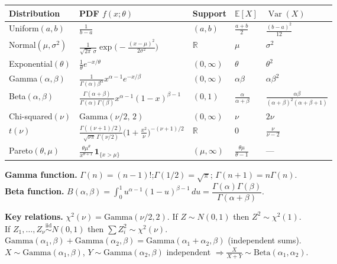 \documentclass[11pt]{article}
\newcommand{\bbE}{\mathbb{E}}
\newcommand{\bbR}{\mathbb{R}}
\newcommand{\Var}{\operatorname{Var}}
\newcommand{\ind}[1]{\bm{1}_{\{#1\}}}
\begin{document}
\begin{tabular}{lllll}
  \toprule
  \textbf{Distribution} & \textbf{PDF} $f(x;\theta)$ &
  \textbf{Support} & $\bbE[X]$ & $\Var(X)$ \\
  \midrule
  Uniform$(a,b)$ & $\frac{1}{b-a}$ & $(a,b)$ & $\frac{a+b}{2}$ &
  $\frac{(b-a)^2}{12}$ \\[4pt]
  Normal$(\mu,\sigma^2)$ &
  $\frac{1}{\sqrt{2\pi}\,\sigma}\exp\!\bigl(-\frac{(x-\mu)^2}{2\sigma^2}\bigr)$
  & $\bbR$ & $\mu$ & $\sigma^2$ \\[4pt]
  Exponential$(\theta)$ & $\frac{1}{\theta}e^{-x/\theta}$ &
  $(0,\infty)$ & $\theta$ & $\theta^2$ \\[4pt]
  Gamma$(\alpha,\beta)$ &
  $\frac{1}{\Gamma(\alpha)\beta^\alpha}x^{\alpha-1}e^{-x/\beta}$ &
  $(0,\infty)$ & $\alpha\beta$ & $\alpha\beta^2$ \\[4pt]
  Beta$(\alpha,\beta)$ &
  $\frac{\Gamma(\alpha+\beta)}{\Gamma(\alpha)\Gamma(\beta)}x^{\alpha-1}(1-x)^{\beta-1}$
  & $(0,1)$ & $\frac{\alpha}{\alpha+\beta}$ &
  $\frac{\alpha\beta}{(\alpha+\beta)^2(\alpha+\beta+1)}$ \\[4pt]
  Chi-squared$(\nu)$ & $\mathrm{Gamma}(\nu/2,\,2)$ & $(0,\infty)$ &
  $\nu$ & $2\nu$ \\[4pt]
  $t(\nu)$ &
  $\frac{\Gamma((\nu+1)/2)}{\sqrt{\nu\pi}\,\Gamma(\nu/2)}\bigl(1+\frac{x^2}{\nu}\bigr)^{-(\nu+1)/2}$
  & $\bbR$ & $0$ & $\frac{\nu}{\nu-2}$ \\[4pt]
  Pareto$(\theta,\mu)$ &
  $\frac{\theta\mu^\theta}{x^{\theta+1}}\,\ind{x>\mu}$ &
  $(\mu,\infty)$ & $\frac{\theta\mu}{\theta-1}$ & --- \\[4pt]
  \bottomrule
\end{tabular}

\medskip
\noindent\textbf{Gamma function.}
$\Gamma(n)=(n-1)!$;\quad $\Gamma(1/2)=\sqrt{\pi}$;\quad
$\Gamma(n+1)=n\Gamma(n)$.\\
\textbf{Beta function.}
$B(\alpha,\beta)=\int_0^1 u^{\alpha-1}(1-u)^{\beta-1}\,du =
\dfrac{\Gamma(\alpha)\Gamma(\beta)}{\Gamma(\alpha+\beta)}$.

\medskip
\noindent\textbf{Key relations.}
$\chi^2(\nu)=\mathrm{Gamma}(\nu/2,2)$.\quad
If $Z\sim N(0,1)$ then $Z^2\sim\chi^2(1)$.\\
If $Z_1,\ldots,Z_\nu \overset{\mathrm{iid}}{\sim}N(0,1)$ then $\sum
Z_i^2\sim\chi^2(\nu)$.\\
$\mathrm{Gamma}(\alpha_1,\beta)+\mathrm{Gamma}(\alpha_2,\beta) =
\mathrm{Gamma}(\alpha_1+\alpha_2,\beta)$ (independent sums).\\
$X\sim\mathrm{Gamma}(\alpha_1,\beta)$,
$Y\sim\mathrm{Gamma}(\alpha_2,\beta)$ independent
$\Rightarrow\frac{X}{X+Y}\sim\mathrm{Beta}(\alpha_1,\alpha_2)$.
\end{document}
